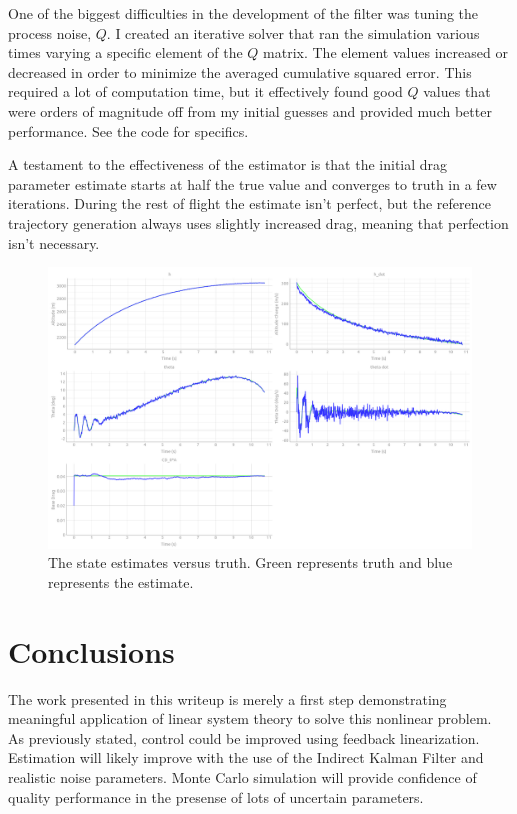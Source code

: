 \documentclass{article}
\begin{document}
  One of the biggest difficulties in the development of the filter was tuning the process noise, $Q$. I created an iterative solver that ran the simulation various times varying a specific element of the $Q$ matrix. The element values increased or decreased in order to minimize the averaged cumulative squared error. This required a lot of computation time, but it effectively found good $Q$ values that were orders of magnitude off from my initial guesses and provided much better performance. See the code for specifics.

  A testament to the effectiveness of the estimator is that the initial drag parameter estimate starts at half the true value and converges to truth in a few iterations. During the rest of flight the estimate isn't perfect, but the reference trajectory generation always uses slightly increased drag, meaning that perfection isn't necessary.

  \begin{figure}
    \includegraphics[width=\linewidth]{figures/estimates.png}
    \caption{The state estimates versus truth. Green represents truth and blue represents the estimate.}
    \label{fig:estimates}
  \end{figure}


  \section{Conclusions}
  The work presented in this writeup is merely a first step demonstrating meaningful application of linear system theory to solve this nonlinear problem. As previously stated, control could be improved using feedback linearization. Estimation will likely improve with the use of the Indirect Kalman Filter and realistic noise parameters. Monte Carlo simulation will provide confidence of quality performance in the presense of lots of uncertain parameters.
\end{document}
